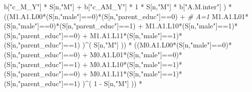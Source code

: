 \documentclass[
]{book}
\newenvironment{Shaded}{\begin{snugshade}}{\end{snugshade}}
\newcommand{\CommentTok}[1]{\textcolor[rgb]{0.56,0.35,0.01}{\textit{#1}}}
\newcommand{\DecValTok}[1]{\textcolor[rgb]{0.00,0.00,0.81}{#1}}
\newcommand{\NormalTok}[1]{#1}
\newcommand{\SpecialCharTok}[1]{\textcolor[rgb]{0.00,0.00,0.00}{#1}}
\newcommand{\StringTok}[1]{\textcolor[rgb]{0.31,0.60,0.02}{#1}}
\begin{document}
\begin{Shaded}
\begin{Highlighting}[]
\NormalTok{                             b[}\StringTok{"c\_M\_Y"}\NormalTok{] }\SpecialCharTok{*}\NormalTok{ S[n,}\StringTok{"M"}\NormalTok{] }\SpecialCharTok{+}
\NormalTok{                             b[}\StringTok{"c\_AM\_Y"}\NormalTok{] }\SpecialCharTok{*} \DecValTok{1} \SpecialCharTok{*}\NormalTok{ S[n,}\StringTok{"M"}\NormalTok{] }\SpecialCharTok{*}\NormalTok{ b[}\StringTok{"A.M.inter"}\NormalTok{] ) }\SpecialCharTok{*}
\NormalTok{      ((M1.A1.L00}\SpecialCharTok{*}\NormalTok{(S[n,}\StringTok{"male"}\NormalTok{]}\SpecialCharTok{==}\DecValTok{0}\NormalTok{)}\SpecialCharTok{*}\NormalTok{(S[n,}\StringTok{"parent\_educ"}\NormalTok{]}\SpecialCharTok{==}\DecValTok{0}\NormalTok{) }\SpecialCharTok{+}                    \CommentTok{\# A\textquotesingle{}=1}
\NormalTok{          M1.A1.L01}\SpecialCharTok{*}\NormalTok{(S[n,}\StringTok{"male"}\NormalTok{]}\SpecialCharTok{==}\DecValTok{0}\NormalTok{)}\SpecialCharTok{*}\NormalTok{(S[n,}\StringTok{"parent\_educ"}\NormalTok{]}\SpecialCharTok{==}\DecValTok{1}\NormalTok{) }\SpecialCharTok{+}
\NormalTok{          M1.A1.L10}\SpecialCharTok{*}\NormalTok{(S[n,}\StringTok{"male"}\NormalTok{]}\SpecialCharTok{==}\DecValTok{1}\NormalTok{)}\SpecialCharTok{*}\NormalTok{(S[n,}\StringTok{"parent\_educ"}\NormalTok{]}\SpecialCharTok{==}\DecValTok{0}\NormalTok{) }\SpecialCharTok{+} 
\NormalTok{          M1.A1.L11}\SpecialCharTok{*}\NormalTok{(S[n,}\StringTok{"male"}\NormalTok{]}\SpecialCharTok{==}\DecValTok{1}\NormalTok{)}\SpecialCharTok{*}\NormalTok{(S[n,}\StringTok{"parent\_educ"}\NormalTok{]}\SpecialCharTok{==}\DecValTok{1}\NormalTok{) )}\SpecialCharTok{\^{}}\NormalTok{( S[n,}\StringTok{"M"}\NormalTok{] )) }\SpecialCharTok{*}
\NormalTok{      ((M0.A1.L00}\SpecialCharTok{*}\NormalTok{(S[n,}\StringTok{"male"}\NormalTok{]}\SpecialCharTok{==}\DecValTok{0}\NormalTok{)}\SpecialCharTok{*}\NormalTok{(S[n,}\StringTok{"parent\_educ"}\NormalTok{]}\SpecialCharTok{==}\DecValTok{0}\NormalTok{) }\SpecialCharTok{+}                
\NormalTok{          M0.A1.L01}\SpecialCharTok{*}\NormalTok{(S[n,}\StringTok{"male"}\NormalTok{]}\SpecialCharTok{==}\DecValTok{0}\NormalTok{)}\SpecialCharTok{*}\NormalTok{(S[n,}\StringTok{"parent\_educ"}\NormalTok{]}\SpecialCharTok{==}\DecValTok{1}\NormalTok{) }\SpecialCharTok{+}
\NormalTok{          M0.A1.L10}\SpecialCharTok{*}\NormalTok{(S[n,}\StringTok{"male"}\NormalTok{]}\SpecialCharTok{==}\DecValTok{1}\NormalTok{)}\SpecialCharTok{*}\NormalTok{(S[n,}\StringTok{"parent\_educ"}\NormalTok{]}\SpecialCharTok{==}\DecValTok{0}\NormalTok{) }\SpecialCharTok{+} 
\NormalTok{          M0.A1.L11}\SpecialCharTok{*}\NormalTok{(S[n,}\StringTok{"male"}\NormalTok{]}\SpecialCharTok{==}\DecValTok{1}\NormalTok{)}\SpecialCharTok{*}\NormalTok{(S[n,}\StringTok{"parent\_educ"}\NormalTok{]}\SpecialCharTok{==}\DecValTok{1}\NormalTok{) )}\SpecialCharTok{\^{}}\NormalTok{( }\DecValTok{1} \SpecialCharTok{{-}}\NormalTok{ S[n,}\StringTok{"M"}\NormalTok{] )) }\SpecialCharTok{*}

\end{Highlighting}
\end{Shaded}
\end{document}

